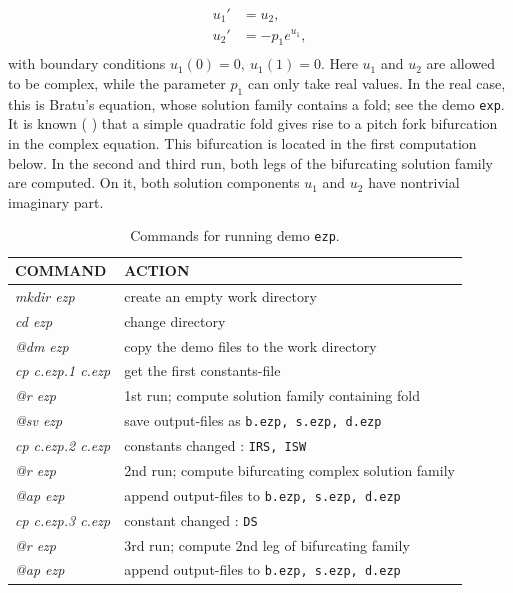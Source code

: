 \documentclass[12pt]{report}
\begin{document}
\begin{equation} \begin{array}{cl}
  u_1 ' &= u_2  ,  \\
  u_2 ' &= -p_1  e^{u_1} , \\
\end{array} \end{equation}
with boundary conditions $ u_1(0)=0 , ~u_1(1)=0.$
Here $u_1$ and $u_2$ are allowed to be complex, 
while the parameter $p_1$ can only take real values.
In the real case, this is Bratu's equation, whose solution family 
contains a fold; see the demo {\tt exp}.
It is known 
( \citeyear{HeKe:90}) that a simple quadratic fold gives rise to a pitch fork
bifurcation in the complex equation.
This bifurcation is located in the first computation below.
In the second and third run, both legs of the bifurcating solution family
are computed.
On it, both solution components $u_1$ and $u_2$ have nontrivial 
imaginary part.



\begin{table}[htbp]
\begin{center}
\begin{tabular}{| l | l |}
\hline
  COMMAND  & ACTION \\
\hline
  {\it mkdir ezp} & create an empty work directory \\ 
  {\it cd ezp} & change directory \\
  {\it @dm ezp} & copy the demo files to the work directory \\
\hline
  {\it cp c.ezp.1 c.ezp} & get the first constants-file \\ 
  {\it @r ezp} & 1st run; compute solution family containing fold \\ 
  {\it @sv ezp} & save output-files as {\tt b.ezp, s.ezp, d.ezp} \\ 
\hline
  {\it cp c.ezp.2 c.ezp} & constants changed : {\tt IRS, ISW} \\ 
  {\it @r ezp} & 2nd run; compute bifurcating complex solution family \\ 
  {\it @ap ezp} & append output-files to {\tt b.ezp, s.ezp, d.ezp} \\ 
\hline
  {\it cp c.ezp.3 c.ezp} & constant changed : {\tt DS} \\ 
  {\it @r ezp} & 3rd run; compute 2nd leg of bifurcating family \\ 
  {\it @ap ezp} & append output-files to {\tt b.ezp, s.ezp, d.ezp} \\
\hline
\end{tabular}
\caption{Commands for running demo {\tt ezp}.}
\label{tbl:demo_ezp}
\end{center}
\end{table}
\end{document}
